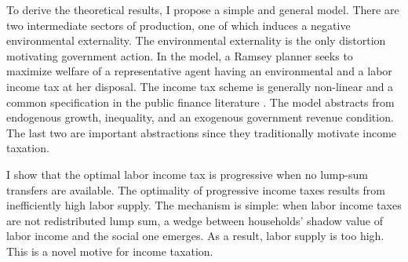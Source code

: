 To derive the theoretical results, I propose a simple and general model. There are two intermediate sectors of production, one of which induces a negative environmental externality. The environmental externality is the only distortion motivating government action. In the model, a Ramsey planner seeks to maximize welfare of a representative agent having  an environmental and a labor income tax at her disposal. The income tax scheme is generally non-linear and a common specification in the public finance literature \citep[e.g.][]{Benabou2002TaxEfficiency, Heathcote2017OptimalFramework}.
The model abstracts from  endogenous growth, inequality, and an exogenous government revenue condition. The last two are important abstractions since they traditionally motivate income taxation.

I show that the optimal labor income tax is progressive when no lump-sum transfers are available. 
The optimality of progressive income taxes results from inefficiently high labor supply. The mechanism is simple: when labor income taxes are not redistributed lump sum, a wedge between households' shadow value of labor income and the social one emerges.  As a result, labor supply is too high. 
This is a novel motive for income taxation.
  
